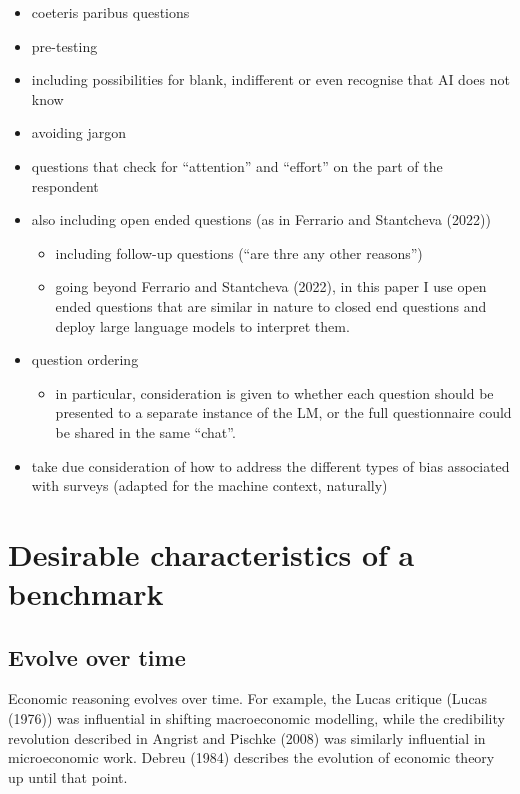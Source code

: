\documentclass[
]{article}
\providecommand{\tightlist}{%
  \setlength{\itemsep}{0pt}\setlength{\parskip}{0pt}}\usepackage{longtable,booktabs,array}
\begin{document}
\begin{itemize}
\tightlist
\item
  coeteris paribus questions
\item
  pre-testing
\item
  including possibilities for blank, indifferent or even recognise that
  AI does not know
\item
  avoiding jargon
\item
  questions that check for ``attention'' and ``effort'' on the part of
  the respondent
\item
  also including open ended questions (as in Ferrario and Stantcheva
  (2022))

  \begin{itemize}
  \tightlist
  \item
    including follow-up questions (``are thre any other reasons'')
  \item
    going beyond Ferrario and Stantcheva (2022), in this paper I use
    open ended questions that are similar in nature to closed end
    questions and deploy large language models to interpret them.
  \end{itemize}
\item
  question ordering

  \begin{itemize}
  \tightlist
  \item
    in particular, consideration is given to whether each question
    should be presented to a separate instance of the LM, or the full
    questionnaire could be shared in the same ``chat''.
  \end{itemize}
\item
  take due consideration of how to address the different types of bias
  associated with surveys (adapted for the machine context, naturally)
\end{itemize}

\section{Desirable characteristics of a
benchmark}\label{desirable-characteristics-of-a-benchmark}

\subsection{Evolve over time}\label{evolve-over-time}

Economic reasoning evolves over time. For example, the Lucas critique
(Lucas (1976)) was influential in shifting macroeconomic modelling,
while the credibility revolution described in Angrist and Pischke (2008)
was similarly influential in microeconomic work. Debreu (1984) describes
the evolution of economic theory up until that point.
\end{document}
